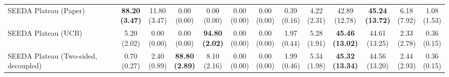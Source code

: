\begin{table}[H]
{\begin{tabular}{l|cccccc|cccccc}
SEEDA Plateau (Paper) & \bfseries \makecell{88.20 \\ (3.47)} & \makecell{11.80 \\ (3.47)} & {\cellcolor[HTML]{C8E6C9}} \makecell{0.00 \\ (0.00)} & \makecell{0.00 \\ (0.00)} & \makecell{0.00 \\ (0.00)} & \makecell{0.00 \\ (0.00)} & \makecell{0.39 \\ (0.16)} & \makecell{4.22 \\ (2.31)} & {\cellcolor[HTML]{C8E6C9}} \makecell{42.89 \\ (12.78)} & \bfseries \makecell{45.24 \\ (13.72)} & \makecell{6.18 \\ (7.92)} & \makecell{1.08 \\ (1.53)} \\
SEEDA Plateau (UCB) & \makecell{5.20 \\ (2.02)} & \makecell{0.00 \\ (0.00)} & {\cellcolor[HTML]{C8E6C9}} \makecell{0.00 \\ (0.00)} & \bfseries \makecell{94.80 \\ (2.02)} & \makecell{0.00 \\ (0.00)} & \makecell{0.00 \\ (0.00)} & \makecell{1.97 \\ (0.44)} & \makecell{5.28 \\ (1.91)} & {\cellcolor[HTML]{C8E6C9}} \bfseries \makecell{45.46 \\ (13.02)} & \makecell{44.61 \\ (13.25)} & \makecell{2.33 \\ (2.78)} & \makecell{0.36 \\ (0.15)} \\
SEEDA Plateau (Two-sided, decoupled) & \makecell{0.70 \\ (0.27)} & \makecell{2.40 \\ (0.89)} & {\cellcolor[HTML]{C8E6C9}} \bfseries \makecell{88.80 \\ (2.89)} & \makecell{8.10 \\ (2.16)} & \makecell{0.00 \\ (0.00)} & \makecell{0.00 \\ (0.00)} & \makecell{1.99 \\ (0.46)} & \makecell{5.34 \\ (1.98)} & {\cellcolor[HTML]{C8E6C9}} \bfseries \makecell{45.32 \\ (13.34)} & \makecell{44.56 \\ (13.20)} & \makecell{2.44 \\ (2.93)} & \makecell{0.36 \\ (0.15)} \\

\end{tabular}}
\end{table}
